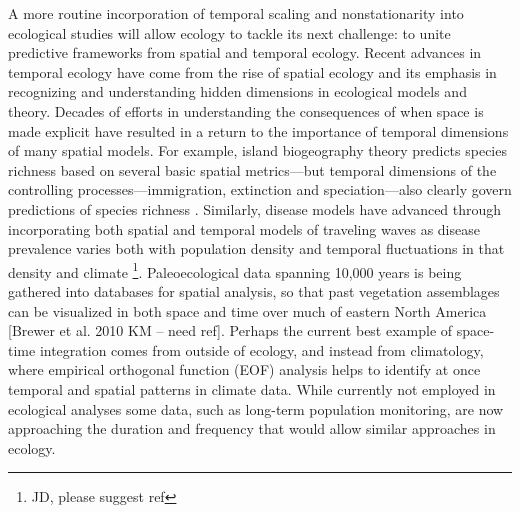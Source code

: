 \documentclass[11pt,a4paper,oneside]{article}
\begin{document}
A more routine incorporation of temporal scaling and nonstationarity into ecological studies will allow ecology to tackle its next challenge: to unite predictive frameworks from spatial and temporal ecology. Recent advances in temporal ecology have come from the rise of spatial ecology and its emphasis in recognizing and understanding hidden dimensions in ecological models and theory. Decades of efforts in understanding the consequences of when space is made explicit have resulted in a return to the importance of temporal dimensions of many spatial models. For example, island biogeography theory predicts species richness based on several basic spatial metrics---but temporal dimensions of the controlling processes---immigration, extinction and speciation---also clearly govern predictions of species richness \citep{Wiens2011}. Similarly, disease models have advanced through incorporating both spatial and temporal models of traveling waves \citep{Grenfell:2001ox} as disease prevalence varies both with population density and temporal fluctuations in that density \citep{Grenfell:2001ox} and climate \footnote{JD, please suggest ref}. Paleoecological data spanning 10,000 years is being gathered into databases for spatial analysis, so that past vegetation assemblages can be visualized in both space and time over much of eastern North America [Brewer et al. 2010 KM -- need ref]. Perhaps the current best example of space-time integration comes from outside of ecology, and instead from climatology, where empirical orthogonal function (EOF) analysis helps to identify at once temporal and spatial patterns in climate data. While currently not employed in ecological analyses some data, such as long-term population monitoring, are now approaching the duration and frequency that would allow similar approaches in ecology. \\
\end{document}
